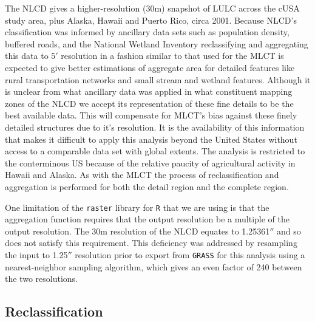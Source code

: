 The NLCD gives a higher-resolution (30m) snapshot of LULC across the
cUSA study area, plus Alaska, Hawaii and Puerto Rico, circa 2001.
Because NLCD's classification was informed by ancillary data sets such
as population density, buffered roads, and the National Wetland
Inventory \citep{Homer2004} reclassifying and aggregating this data to
$5'$ resolution in a fashion similar to that used for the MLCT is
expected to give better estimations of aggregate area for detailed
features like rural transportation networks and small stream and
wetland features.  Although it is unclear from \citet{Homer2004} what
ancillary data was applied in what constituent mapping zones of the
NLCD we accept its representation of these fine details to be the best
available data.  This will compensate for MLCT's bias against these
finely detailed structures due to it's resolution.  It is the
availability of this information that makes it difficult to apply this
analysis beyond the United States without access to a comparable data
set with global extents.  The analysis is restricted to the
conterminous US because of the relative paucity of agricultural
activity in Hawaii and Alaska.  As with the MLCT the process of
reclassification and aggregation is performed for both the detail
region and the complete region.

One limitation of the \texttt{raster} library for \texttt{R} that we
are using is that the aggregation function requires that the output
resolution be a multiple of the output resolution.  The 30m resolution
of the NLCD equates to 1.25361$''$ and so does not satisfy this
requirement.  This deficiency was addressed by resampling the input to
1.25$''$ resolution prior to export from \texttt{GRASS} for this
analysis using a nearest-neighbor sampling algorithm, which gives an
even factor of 240 between the two resolutions.



\clearpage

\subsection{Reclassification}
\label{sec:nlcd-reclass}


